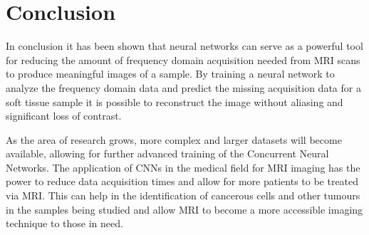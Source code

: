 \documentclass[14pt]{extreport}
\begin{document}
    \section*{Conclusion}
        In conclusion it has been shown that neural networks can serve as a powerful tool for reducing the amount of frequency domain acquisition needed from MRI scans to produce meaningful images of a sample. By training a neural network to analyze the frequency domain data and predict the missing acquisition data for a soft tissue sample it is possible to reconstruct the image without aliasing and significant loss of contrast. 

        As the area of research grows, more complex and larger datasets will become available, allowing for further advanced training of the Concurrent Neural Networks. The application of CNNs in the medical field for MRI imaging has the power to reduce data acquisition times and allow for more patients to be treated via MRI. This can help in the identification of cancerous cells and other tumours in the samples being studied and allow MRI to become a more accessible imaging technique to those in need.




    
    
\end{document}
